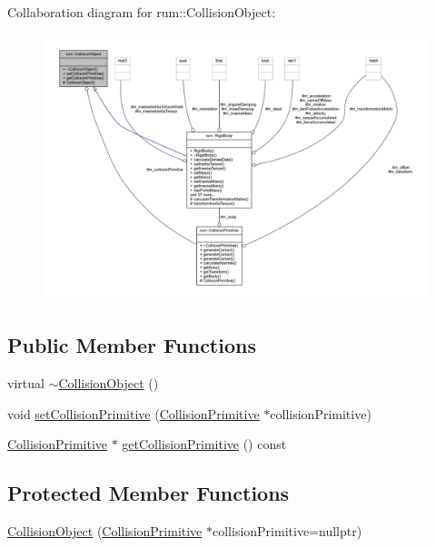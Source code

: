 Collaboration diagram for rum\+:\+:Collision\+Object\+:\nopagebreak
\begin{figure}[H]
\begin{center}
\leavevmode
\includegraphics[width=350pt]{classrum_1_1_collision_object__coll__graph}
\end{center}
\end{figure}
\subsection*{Public Member Functions}
\begin{DoxyCompactItemize}
\item 
virtual \mbox{\hyperlink{classrum_1_1_collision_object_aeff80558a8d138cbf9135839f3025c65}{$\sim$\+Collision\+Object}} ()
\item 
void \mbox{\hyperlink{classrum_1_1_collision_object_a6a51db184f85e14fc88a5bbf0e2c0499}{set\+Collision\+Primitive}} (\mbox{\hyperlink{classrum_1_1_collision_primitive}{Collision\+Primitive}} $\ast$collision\+Primitive)
\item 
\mbox{\hyperlink{classrum_1_1_collision_primitive}{Collision\+Primitive}} $\ast$ \mbox{\hyperlink{classrum_1_1_collision_object_a81a1721b421cda5aee94c8e7c3b615da}{get\+Collision\+Primitive}} () const
\end{DoxyCompactItemize}
\subsection*{Protected Member Functions}
\begin{DoxyCompactItemize}
\item 
\mbox{\hyperlink{classrum_1_1_collision_object_a260160b0f7b1d940b6388563dc97ce36}{Collision\+Object}} (\mbox{\hyperlink{classrum_1_1_collision_primitive}{Collision\+Primitive}} $\ast$collision\+Primitive=nullptr)
\end{DoxyCompactItemize}
